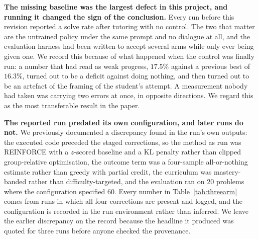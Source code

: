 %
\textbf{The missing baseline was the largest defect in this project, and running
it changed the sign of the conclusion.} Every run before this revision reported
a solve rate after tutoring with no control. The two that matter are the
untrained policy under the same prompt and no dialogue at all, and the
evaluation harness had been written to accept several arms while only ever being
given one. We record this because of what happened when the control was finally
run: a number that had read as weak progress, $17.5\%$ against a previous best
of $16.3\%$, turned out to be a deficit against doing nothing, and then turned
out to be an artefact of the framing of the student's attempt. A measurement
nobody had taken was carrying two errors at once, in opposite directions. We
regard this as the most transferable result in the paper.


%
\textbf{The reported run predated its own configuration, and later runs do not.}
We previously documented a discrepancy found in the run's own outputs: the
executed code preceded the staged corrections, so the method as run was
REINFORCE with a $z$-scored baseline and a KL penalty rather than clipped
group-relative optimisation, the outcome term was a four-sample all-or-nothing
estimate rather than greedy with partial credit, the curriculum was
mastery-banded rather than difficulty-targeted, and the evaluation ran on 20
problems where the configuration specified 60. Every number in
Table~\ref{tab:threearm} comes from runs in which all four corrections are
present and logged, and the configuration is recorded in the run environment
rather than inferred. We leave the earlier discrepancy on the record because the
headline it produced was quoted for three runs before anyone checked the
provenance.


